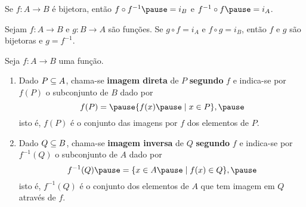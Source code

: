 \documentclass{beamer}
\begin{document}
    \begin{frame}
        \begin{proposicao}
            Se $f : A \to B$ \pause é bijetora, \pause então $f\circ f^{-1} \pause = i_{B}$ \pause e $f^{-1}\circ f \pause = i_{A}$.
        \end{proposicao}
    \end{frame}

    \begin{frame}
        \begin{proposicao}
            Sejam $f : A \to B$ \pause e $g : B \to A$ \pause são funções. \pause Se $g\circ f = i_{A}$ \pause e $f\circ g = i_{B}$, \pause então \pause $f$ e $g$ são bijetoras \pause e $g=f^{-1}$.
        \end{proposicao}
    \end{frame}

    \begin{frame}
        \begin{definicao}
            Seja $f : A \to B$ \pause uma função.\pause
            \begin{enumerate}[label={\roman*})]
                \item Dado $P \subseteq A$, \pause chama-se \textbf{imagem direta} \pause de $P$ \pause \textbf{segundo} $f$ \pause e indica-se por $f(P)$ \pause o subconjunto de $B$ \pause dado por\pause
                \[
                    f(P) = \pause \{f(x) \pause \mid x \in P\},\pause
                \]
                isto é, \pause $f(P)$ \pause é o conjunto das imagens por $f$ \pause dos elementos de $P$.\pause

                \vspace{.5cm}

                \item Dado $Q \subseteq B$, \pause chama-se \textbf{imagem inversa} \pause de $Q$ \textbf{segundo} $f$ \pause e indica-se por \pause $f^{-1}(Q)$ \pause o subconjunto de $A$ \pause dado por\pause
                \[
                    f^{-1}(Q) \pause = \{x \in A \pause \mid f(x) \in Q\},\pause
                \]
                isto é, \pause $f^{-1}(Q)$ \pause é o conjunto dos elementos de $A$ \pause que tem imagem em $Q$ \pause através de $f$.
            \end{enumerate}
        \end{definicao}
    \end{frame}
\end{document}
